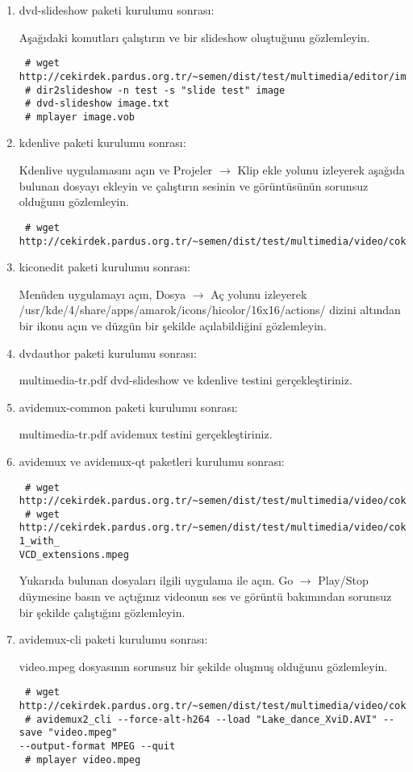 \documentclass[a4paper,10pt]{article}
\begin{document}
\begin{enumerate}
 \item dvd-slideshow paketi kurulumu sonrası:

Aşağıdaki komutları çalıştırın ve bir slideshow oluştuğunu gözlemleyin.
\begin{verbatim}
 # wget http://cekirdek.pardus.org.tr/~semen/dist/test/multimedia/editor/image.tar.gz
 # dir2slideshow -n test -s "slide test" image
 # dvd-slideshow image.txt
 # mplayer image.vob 
\end{verbatim}
\item kdenlive paketi kurulumu sonrası:

Kdenlive uygulamasını açın ve Projeler $\rightarrow$ Klip ekle yolunu izleyerek aşağıda bulunan dosyayı ekleyin ve çalıştırın sesinin ve görüntüsünün sorunsuz olduğunu gözlemleyin.
\begin{verbatim}
 # wget http://cekirdek.pardus.org.tr/~semen/dist/test/multimedia/video/cokluortam/DVD.mpg
\end{verbatim}

\item kiconedit paketi kurulumu sonrası:

Menüden uygulamayı açın, Dosya $\rightarrow$ Aç yolunu izleyerek /usr/kde/4/share/apps/amarok/icons/hicolor/16x16/actions/ dizini altından bir ikonu açın ve düzgün bir şekilde açılabildiğini gözlemleyin.

\item dvdauthor paketi kurulumu sonrası:

multimedia-tr.pdf dvd-slideshow ve kdenlive testini gerçekleştiriniz.

 \item avidemux-common paketi kurulumu sonrası:

 multimedia-tr.pdf avidemux testini gerçekleştiriniz.

 \item avidemux ve avidemux-qt paketleri kurulumu sonrası:

\begin{verbatim}
 # wget http://cekirdek.pardus.org.tr/~semen/dist/test/multimedia/video/cokluortam/Lake_dance_XviD.AVI
 # wget http://cekirdek.pardus.org.tr/~semen/dist/test/multimedia/video/cokluortam/MPEG-1_with_
VCD_extensions.mpeg
\end{verbatim}
Yukarıda bulunan dosyaları ilgili uygulama ile açın. Go $\rightarrow$ Play/Stop düymesine basın ve açtığınız videonun ses ve görüntü bakımından sorunsuz bir şekilde çalıştığını gözlemleyin.
\item avidemux-cli paketi kurulumu sonrası:

video.mpeg dosyasının sorunsuz bir şekilde oluşmuş olduğunu gözlemleyin.
\begin{verbatim}
 # wget http://cekirdek.pardus.org.tr/~semen/dist/test/multimedia/video/cokluortam/Lake_dance_XviD.AVI
 # avidemux2_cli --force-alt-h264 --load "Lake_dance_XviD.AVI" --save "video.mpeg" 
--output-format MPEG --quit 
 # mplayer video.mpeg
\end{verbatim}

\end{enumerate}
\end{document}
